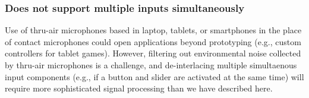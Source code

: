     \subsubsection{Does not support multiple inputs simultaneously}
    Use of thru-air microphones based in laptop, tablets, or smartphones in the place of contact microphones could open applications beyond prototyping (e.g., custom controllers for tablet games). However, filtering out environmental noise collected by thru-air microphones is a challenge, and de-interlacing multiple simultaenous input components (e.g., if a button and slider are activated at the same time) will require more sophisticated signal processing than we have described here.